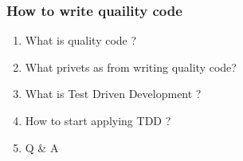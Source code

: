 \documentclass[serif,mathserif,14pt,aspectratio=169]{beamer}
\begin{document}
\begin{frame}
\frametitle{How to write quaility code}
\begin{enumerate} 
    \item What is quality code ?\pause
    \item What privets as from writing quality code?\pause
    \item What is Test Driven Development ?\pause
    \item How to start applying TDD ?\pause
    \item Q \& A 
\end{enumerate} 
\end{frame}




%

\end{document}
